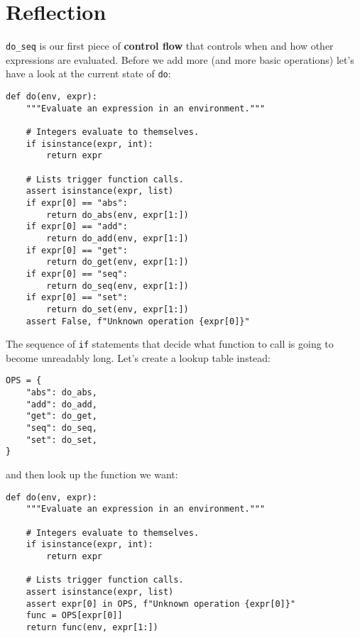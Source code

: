 \documentclass{scrbook}
\newcommand{\glossref}[1]{\textbf{#1}}
\begin{document}
\section{Reflection}\label{interpreter-reflection}


\texttt{do\_seq} is our first piece of \glossref{control flow}
that controls when and how other expressions are evaluated.
Before we add more (and more basic operations)
let's have a look at the current state of \texttt{do}:


\begin{lstlisting}[frame=single,frameround=tttt]
def do(env, expr):
    """Evaluate an expression in an environment."""

    # Integers evaluate to themselves.
    if isinstance(expr, int):
        return expr

    # Lists trigger function calls.
    assert isinstance(expr, list)
    if expr[0] == "abs":
        return do_abs(env, expr[1:])
    if expr[0] == "add":
        return do_add(env, expr[1:])
    if expr[0] == "get":
        return do_get(env, expr[1:])
    if expr[0] == "seq":
        return do_seq(env, expr[1:])
    if expr[0] == "set":
        return do_set(env, expr[1:])
    assert False, f"Unknown operation {expr[0]}"
\end{lstlisting}



The sequence of \texttt{if} statements that decide what function to call
is going to become unreadably long.
Let's create a lookup table instead:


\begin{lstlisting}[frame=single,frameround=tttt]
OPS = {
    "abs": do_abs,
    "add": do_add,
    "get": do_get,
    "seq": do_seq,
    "set": do_set,
}
\end{lstlisting}



\noindent and then look up the function we want:


\begin{lstlisting}[frame=single,frameround=tttt]
def do(env, expr):
    """Evaluate an expression in an environment."""

    # Integers evaluate to themselves.
    if isinstance(expr, int):
        return expr

    # Lists trigger function calls.
    assert isinstance(expr, list)
    assert expr[0] in OPS, f"Unknown operation {expr[0]}"
    func = OPS[expr[0]]
    return func(env, expr[1:])
\end{lstlisting}
\end{document}
